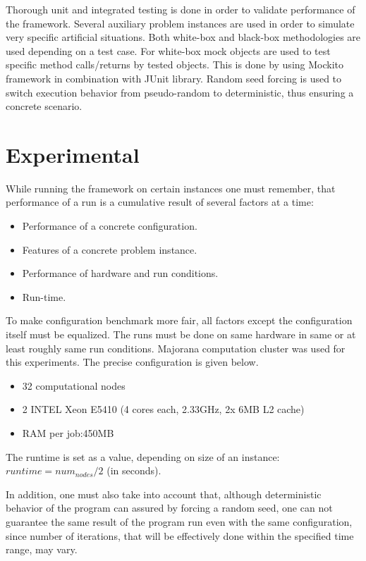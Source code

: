 \documentclass[11pt,a4paper,oneside]{book}
\begin{document}
Thorough unit and integrated testing is done in order to validate performance of the framework. Several auxiliary problem instances are used in order to simulate very specific artificial situations. Both white-box and black-box methodologies are used depending on a test case. For white-box mock objects are used to test specific method calls/returns by tested objects. This is done by using Mockito framework in combination with JUnit library. Random seed forcing is used to switch execution behavior
from pseudo-random to deterministic, thus ensuring a concrete scenario.

\chapter{Experimental}

While running the framework on certain instances one must remember, that performance of a run is a cumulative result of several factors at a time: 

\begin{itemize}
\item Performance of a concrete configuration.
\item Features of a concrete problem instance.
\item Performance of hardware and run conditions.
\item Run-time.
\end{itemize}

To make configuration benchmark more fair, all factors except the configuration itself must be equalized. The runs must be done on same hardware in same or at least roughly same run conditions. Majorana computation cluster was used for this experiments. The precise configuration is given below.
\begin{itemize}
\item 32 computational nodes
\item 2 INTEL Xeon E5410 (4 cores each, 2.33GHz, 2x 6MB L2 cache)
\item RAM per job:450MB
\end{itemize}

The runtime is set as a value, depending on size of an instance: $runtime = num_{nodes} / 2$ (in seconds).

In addition, one must also take into account that, although deterministic behavior of the program can assured by forcing a random seed, one can not guarantee the same result of the program run even with the same configuration, since number of iterations, that will be effectively done within the specified time range, may vary.
\end{document}
